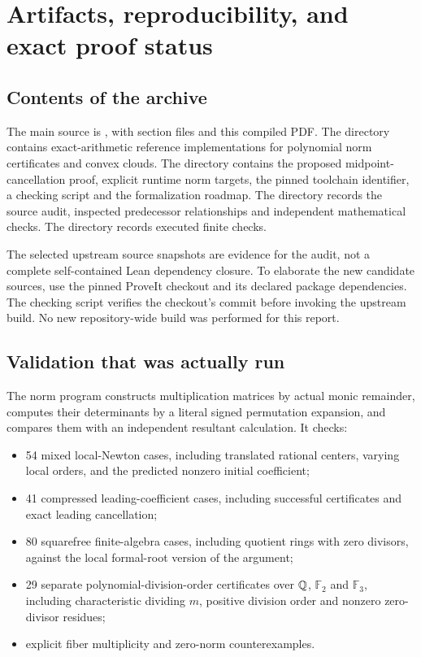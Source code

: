 \section{Artifacts, reproducibility, and exact proof status}
\label{sec:artifacts}

\subsection{Contents of the archive}

The main source is , with section files and this compiled PDF. The  directory contains exact-arithmetic reference implementations for polynomial norm certificates and convex clouds. The  directory contains the proposed midpoint-cancellation proof, explicit runtime norm targets, the pinned toolchain identifier, a checking script and the formalization roadmap. The  directory records the source audit, inspected predecessor relationships and independent mathematical checks. The  directory records executed finite checks.

The selected upstream source snapshots are evidence for the audit, not a complete self-contained Lean dependency closure. To elaborate the new candidate sources, use the pinned ProveIt checkout and its declared package dependencies. The checking script verifies the checkout's commit before invoking the upstream build. No new repository-wide build was performed for this report.

\subsection{Validation that was actually run}

The norm program constructs multiplication matrices by actual monic remainder, computes their determinants by a literal signed permutation expansion, and compares them with an independent resultant calculation. It checks:
\begin{itemize}
\item 54 mixed local-Newton cases, including translated rational centers, varying local orders, and the predicted nonzero initial coefficient;
\item 41 compressed leading-coefficient cases, including successful certificates and exact leading cancellation;
\item 80 squarefree finite-algebra cases, including quotient rings with zero divisors, against the local formal-root version of the argument;
\item 29 separate polynomial-division-order certificates over $\mathbb Q$, $\mathbb F_2$ and $\mathbb F_3$, including characteristic dividing $m$, positive division order and nonzero zero-divisor residues;
\item explicit fiber multiplicity and zero-norm counterexamples.
\end{itemize}

